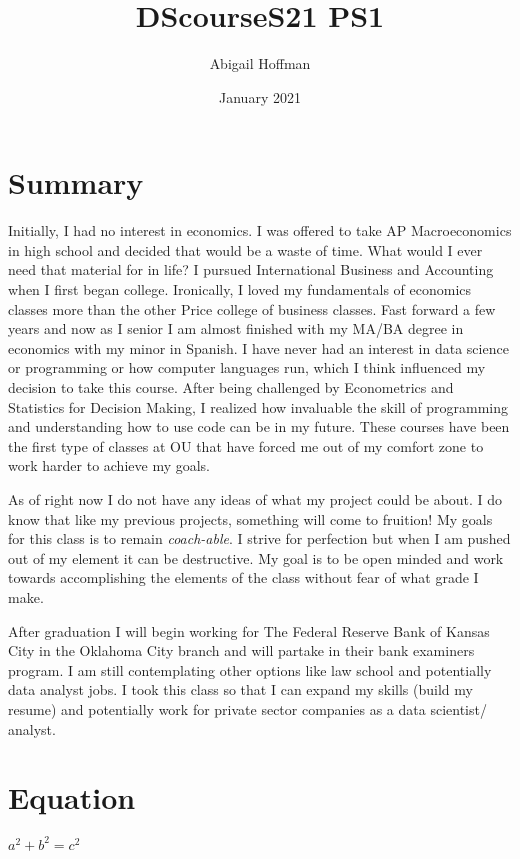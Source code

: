 \documentclass{article}
\title{DScourseS21 PS1}
\author{Abigail Hoffman }
\date{January 2021}
\begin{document}
\maketitle

\section{Summary}
	Initially, I had no interest in economics. I was offered to take AP Macroeconomics in high school and decided that would be a waste of time. What would I ever need that material for in life? I pursued International Business and Accounting when I first began college. Ironically, I loved my fundamentals of economics classes more than the other Price college of business classes. Fast forward a few years and now as I senior I am almost finished with my MA/BA degree in economics with my minor in Spanish. I have never had an interest in data science or programming or how computer languages run, which I think influenced my decision to take this course. After being challenged by Econometrics and Statistics for Decision Making, I realized how invaluable the skill of programming and understanding how to use code can be in my future. These courses have been the first type of classes at OU that have forced me out of my comfort zone to work harder to achieve my goals. 

As of right now I do not have any ideas of what my project could be about. I do know that like my previous projects, something will come to fruition! 
My goals for this class is to remain \textit{coach-able}. I strive for perfection but when I am pushed out of my element it can be destructive. My goal is to be open minded and work towards accomplishing the elements of the class without fear of what grade I make. 

After graduation I will begin working for The Federal Reserve Bank of Kansas City in the Oklahoma City branch and will partake in their bank examiners program. I am still contemplating other options like law school and potentially data analyst jobs. I took this class so that I can expand my skills (build my resume) and potentially work for private sector companies as a data scientist/ analyst.


\section{Equation}
$a^2+b^2=c^2$
\end{document}

